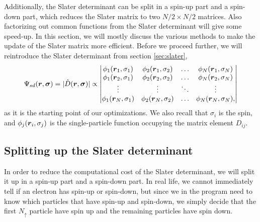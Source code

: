 Additionally, the Slater determinant can be split in a spin-up part and a spin-down part, which reduces the Slater matrix to two $N/2\times N/2$ matrices. Also factorizing out common functions from the Slater determinant will give some speed-up. In this section, we will mostly discuss the various methods to make the update of the Slater matrix more efficient. Before we proceed further, we will reintroduce the Slater determinant from section \ref{sec:slater},
\begin{equation}
\Psi_{sd}(\boldsymbol{{r}},\boldsymbol{{\sigma}})=|\hat{D}(\boldsymbol{{r}},\boldsymbol{{\sigma}})|\propto
\begin{vmatrix}
\phi_1(\boldsymbol{r}_1,\sigma_1) & \phi_2(\boldsymbol{r}_1,\sigma_2) & \hdots & \phi_N(\boldsymbol{r}_1,\sigma_N)\\
\phi_1(\boldsymbol{r}_2,\sigma_1) & \phi_2(\boldsymbol{r}_2,\sigma_2) & \hdots & \phi_N(\boldsymbol{r}_2,\sigma_N)\\
\vdots & \vdots & \ddots & \vdots \\
\phi_1(\boldsymbol{r}_N,\sigma_1) & \phi_2(\boldsymbol{r}_N,\sigma_2) & \hdots & \phi_N(\boldsymbol{r}_N,\sigma_N),
\end{vmatrix}
\label{eq:generalslater}
\end{equation}
as it is the starting point of our optimizations. We also recall that $\sigma_i$ is the spin, and $\phi_j(\boldsymbol{{r}}_i,\sigma_j)$ is the single-particle function occupying the matrix element $D_{ij}$.

\subsection{Splitting up the Slater determinant} \label{sec:splittingofslater}
In order to reduce the computational cost of the Slater determinant, we will split it up in a spin-up part and a spin-down part. In real life, we cannot immediately tell if an electron has spin-up or spin-down, but since we in the program need to know which particles that have spin-up and spin-down, we simply decide that the first $N_{\uparrow}$ particle have spin up and the remaining particles have spin down. 

